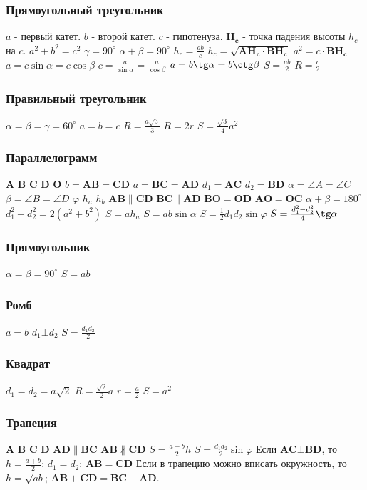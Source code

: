 \subsubsection{Прямоугольный треугольник}
$a$ - первый катет.
$b$ - второй катет.
$c$ - гипотенуза.
$\boldsymbol{H_c}$ - точка падения высоты $h_c$ на $c$.
$ a^2 + b^2 = c^2 $
$ \gamma = 90^{\circ} $
$ \alpha + \beta = 90^{\circ} $
$ h_c = \frac{a b}{c} $
$ h_c = \sqrt{\boldsymbol{AH_c}\cdot\boldsymbol{BH_c}} $
$ a^2 = c\cdot \boldsymbol{BH_c} $
$ a = c \sin \alpha = c \cos \beta $
$ c = \frac{a}{\sin \alpha} = \frac{a}{\cos \beta} $
$ a = b\tg \alpha = b \ctg \beta $
$ S = \frac{a b}{2} $
$ R = \frac{c}{2} $
\subsubsection{Правильный треугольник}
$ \alpha = \beta = \gamma = 60^{\circ} $
$ a = b = c $
$ R = \frac{a\sqrt{3}}{3} $
$ R = 2r $
$ S = \frac{\sqrt{3}}{4} a^2 $
\subsubsection{Параллелограмм}
$\boldsymbol{A}$
$\boldsymbol{B}$
$\boldsymbol{C}$
$\boldsymbol{D}$
$\boldsymbol{O}$
$b = \boldsymbol{AB} = \boldsymbol{CD}$
$a = \boldsymbol{BC} = \boldsymbol{AD}$
$d_1 = \boldsymbol{AC}$
$d_2 = \boldsymbol{BD}$
$\alpha = \angle A = \angle C$
$\beta = \angle B = \angle D$
$\varphi$
$h_a$
$h_b$
$ \boldsymbol{AB} \parallel \boldsymbol{CD} $
$ \boldsymbol{BC} \parallel \boldsymbol{AD} $
$ \boldsymbol{BO} = \boldsymbol{OD} $
$ \boldsymbol{AO} = \boldsymbol{OC} $
$ \alpha + \beta = 180^{\circ} $
$ d_1^2 + d_2^2 = 2(a^2 + b^2) $
$ S = a h_a $
$ S = a b \sin \alpha $
$ S = \frac{1}{2} d_1 d_2 \sin \varphi $
$ S = \frac{d_1^2 - d_2^2}{4} \tg \alpha $
\subsubsection{Прямоугольник}
$ \alpha = \beta = 90^{\circ} $
$ S = a b $
\subsubsection{Ромб}
$ a = b $
$ d_1 \bot d_2 $
$ S = \frac{d_1 d_2}{2} $
\subsubsection{Квадрат}
$ d_1 = d_2 = a\sqrt{2} $
$ R = \frac{\sqrt{2}}{2} a $
$ r = \frac{a}{2} $
$ S = a^2 $
\subsubsection{Трапеция}
$\boldsymbol{A}$
$\boldsymbol{B}$
$\boldsymbol{C}$
$\boldsymbol{D}$
$ \boldsymbol{AD} \parallel \boldsymbol{BC} $
$ \boldsymbol{AB} \nparallel \boldsymbol{CD} $
$ S = \frac{a + b}{2} h $
$ S = \frac{d_1 d_2}{2} \sin \varphi $
Если $ \boldsymbol{AC} \bot \boldsymbol{BD} $, то $ h = \frac{a + b}{2} $; $ d_1 = d_2 $; $ \boldsymbol{AB} = \boldsymbol{CD} $
Если в трапецию можно вписать окружность, то $ h = \sqrt{ab}$; $ \boldsymbol{AB} + \boldsymbol{CD} = \boldsymbol{BC} + \boldsymbol{AD} $.
